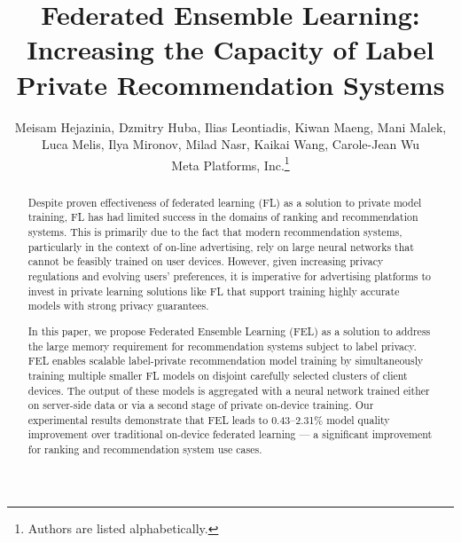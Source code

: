 \documentclass{article}
\title{Federated Ensemble Learning: Increasing the Capacity of Label Private Recommendation Systems}
\author{Meisam Hejazinia, Dzmitry Huba, Ilias Leontiadis, Kiwan Maeng, Mani Malek, \\ Luca Melis, Ilya Mironov, Milad Nasr, Kaikai Wang, Carole-Jean Wu \\
Meta Platforms, Inc.\footnote{Authors are listed alphabetically.}}
\begin{document}
\maketitle
\begin{abstract}
\vspace{-0.25cm}
Despite proven effectiveness of federated learning (FL) as a solution to private model training, FL has had limited success in the domains of ranking and recommendation systems. This is primarily due to the fact that modern recommendation systems, particularly in the context of on-line advertising, rely on large neural networks that cannot be feasibly trained on user devices.
However, given increasing privacy regulations and evolving users' preferences, it is imperative for advertising platforms to invest in private learning solutions like FL that support training highly accurate models with strong privacy guarantees.

In this paper, we propose Federated Ensemble Learning (FEL) as a solution to address the large memory requirement for recommendation systems subject to label privacy. FEL enables scalable label-private recommendation model training by simultaneously training multiple smaller FL models on disjoint carefully selected clusters of client devices. The output of these models is aggregated with a neural network trained  either on server-side data or via a second stage of private on-device training. Our experimental results demonstrate that FEL leads to 0.43--2.31\% model quality improvement over traditional on-device federated learning --- a significant improvement for ranking and recommendation system use cases.



\end{abstract}
\end{document}
